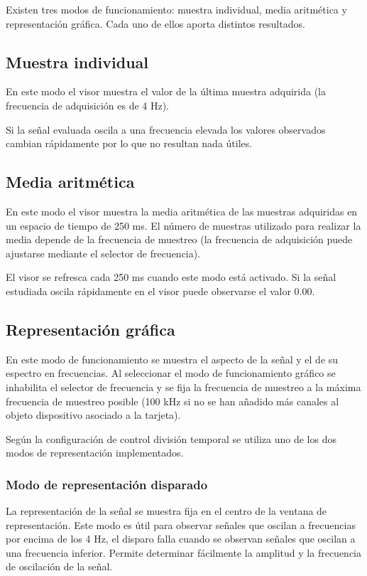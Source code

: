 Existen tres modos de funcionamiento: muestra individual, media aritmética
y representación gráfica. Cada uno de ellos aporta distintos resultados.


\subsection{Muestra individual}

En este modo el visor muestra el valor de la última muestra adquirida (la
frecuencia de adquisición es de 4 Hz).

Si la señal evaluada oscila a una frecuencia elevada los valores observados
cambian rápidamente por lo que no resultan nada útiles.


\subsection{Media aritmética}

En este modo el visor muestra la media aritmética de las muestras
adquiridas en un espacio de tiempo de 250 ms. El número de muestras
utilizado para realizar la media depende de la frecuencia de muestreo (la
frecuencia de adquisición puede ajustarse mediante el selector de
frecuencia).

El visor se refresca cada 250 ms cuando este modo está activado. Si la
señal estudiada oscila rápidamente en el visor puede observarse el valor
$0.00$.


\subsection{Representación gráfica}

En este modo de funcionamiento se muestra el aspecto de la señal y el de su
espectro en frecuencias. Al seleccionar el modo de funcionamiento gráfico
se inhabilita el selector de frecuencia y se fija la frecuencia de muestreo
a la máxima frecuencia de muestreo posible (100 kHz si no se han añadido
más canales al objeto dispositivo asociado a la tarjeta).

Según la configuración de control división temporal se utiliza uno de los
dos modos de representación implementados.


\subsubsection{Modo de representación disparado}

La representación de la señal se muestra fija en el centro de la ventana de
representación. Este modo es útil para observar señales que oscilan a
frecuencias por encima de los 4 Hz, el disparo falla cuando se observan
señales que oscilan a una frecuencia inferior. Permite determinar
fácilmente la amplitud y la frecuencia de oscilación de la señal.


